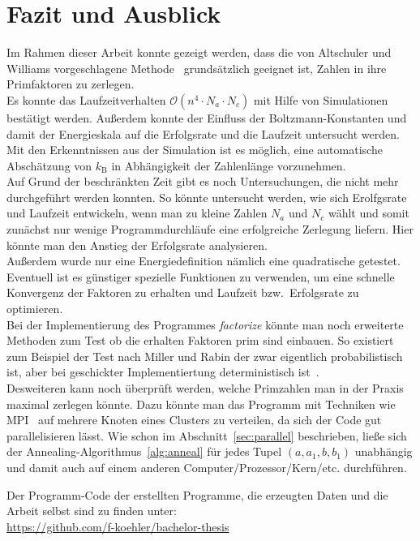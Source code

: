 \chapter{Fazit und Ausblick}\label{ch:conclusion}
Im Rahmen dieser Arbeit konnte gezeigt werden, dass die von Altschuler und Williams vorgeschlagene Methode~\parencite{altschuler} grundsätzlich geeignet ist, Zahlen in ihre Primfaktoren zu zerlegen. \\
Es konnte das Laufzeitverhalten $\mathcal{O}\left(n^4\cdot N_a \cdot N_c\right)$ mit Hilfe von Simulationen bestätigt werden. Außerdem konnte der Einfluss der Boltzmann-Konstanten und damit der Energieskala auf die Erfolgsrate und die Laufzeit untersucht werden. Mit den Erkenntnissen aus der Simulation ist es möglich, eine automatische Abschätzung von $k_\mathrm{B}$ in Abhängigkeit der Zahlenlänge vorzunehmen. \\
Auf Grund der beschränkten Zeit gibt es noch Untersuchungen, die nicht mehr durchgeführt werden konnten. So könnte untersucht werden, wie sich Erolfgsrate und Laufzeit entwickeln, wenn man zu kleine Zahlen $N_a$ und $N_c$ wählt und somit zunächst nur wenige Programmdurchläufe eine erfolgreiche Zerlegung liefern. Hier könnte man den Anstieg der Erfolgsrate analysieren.\\
Außerdem wurde nur eine Energiedefinition nämlich eine quadratische getestet. Eventuell ist es günstiger spezielle Funktionen zu verwenden, um eine schnelle Konvergenz der Faktoren zu erhalten und Laufzeit bzw.\ Erfolgsrate zu optimieren. \\
Bei der Implementierung des Programmes \textit{factorize} könnte man noch erweiterte Methoden zum Test ob die erhalten Faktoren prim sind einbauen. So existiert zum Beispiel der Test nach Miller und Rabin der zwar eigentlich probabilistisch ist, aber bei geschickter Implementiertung deterministisch ist~\parencite{miller}.\\
Desweiteren kann noch überprüft werden, welche Primzahlen man in der Praxis maximal zerlegen könnte. Dazu könnte man das Programm mit Techniken wie MPI~\parencite{mpi} auf mehrere Knoten eines Clusters zu verteilen, da sich der Code gut parallelisieren lässt. Wie schon im Abschnitt~\ref{sec:parallel} beschrieben, ließe sich der Annealing-Algorithmus~\ref{alg:anneal} für jedes Tupel $\left(a,a_1,b,b_1\right)$ unabhängig und damit auch auf einem anderen Computer/Prozessor/Kern/etc. durchführen.

\vfill
Der Programm-Code der erstellten Programme, die erzeugten Daten und die Arbeit selbst sind zu finden unter:\\
\url{https://github.com/f-koehler/bachelor-thesis}
